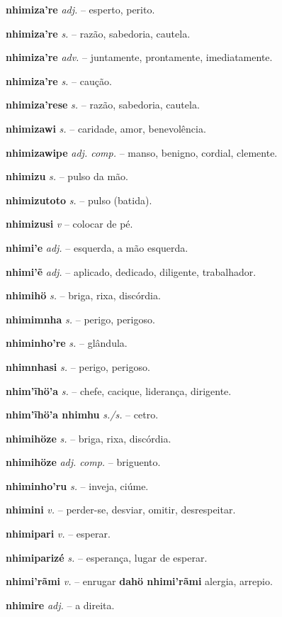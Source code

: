\textbf{nhimiza're} \textit{adj.} -- esperto, perito.

\textbf{nhimiza're} \textit{s.} -- razão, sabedoria, cautela.

\textbf{nhimiza're} \textit{adv.} -- juntamente, prontamente, imediatamente.

\textbf{nhimiza're} \textit{s.} -- caução.

\textbf{nhimiza'rese} \textit{s.} -- razão, sabedoria, cautela.

\textbf{nhimizawi} \textit{s.} -- caridade, amor, benevolência.

\textbf{nhimizawipe} \textit{adj. comp.} -- manso, benigno, cordial, clemente.

\textbf{nhimizu} \textit{s.} -- pulso da mão.

\textbf{nhimizutoto} \textit{s.} -- pulso (batida).

\textbf{nhimizusi} \textit{v} -- colocar de pé.

\textbf{nhimi'e} \textit{adj.} -- esquerda, a mão esquerda.

\textbf{nhimi'ẽ} \textit{adj.} -- aplicado, dedicado, diligente, trabalhador.

\textbf{nhimihö} \textit{s.} -- briga, rixa, discórdia.

\textbf{nhimimnha} \textit{s.} -- perigo, perigoso.

\textbf{nhiminho're} \textit{s.} -- glândula.

\textbf{nhimnhasi} \textit{s.} -- perigo, perigoso.

\textbf{nhim'ĩhö'a} \textit{s.} -- chefe, cacique, liderança, dirigente.

\textbf{nhim'ĩhö'a nhimhu} \textit{s./s.} -- cetro.

\textbf{nhimihöze} \textit{s.} -- briga, rixa, discórdia.

\textbf{nhimihöze} \textit{adj. comp.} -- briguento.

\textbf{nhiminho'ru} \textit{s.} -- inveja, ciúme.

\textbf{nhimini} \textit{v.} -- perder-se, desviar, omitir, desrespeitar.

\textbf{nhimipari} \textit{v.} -- esperar.

\textbf{nhimiparizé} \textit{s.} -- esperança, lugar de esperar.

\textbf{nhimi'rãmi} \textit{v.} -- enrugar  \textbf{dahö nhimi'rãmi} alergia, arrepio.

\textbf{nhimire} \textit{adj.} -- a direita.


